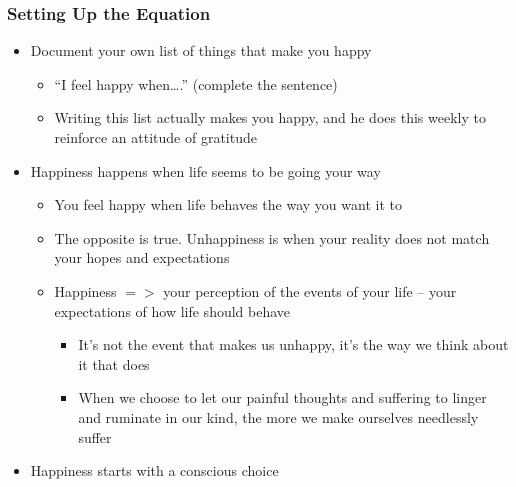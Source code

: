 \begin{frame}[fragile]\frametitle{Setting Up the Equation}

\begin{itemize}
\item Document your own list of things that make you happy
	\begin{itemize}
	\item “I feel happy when….” (complete the sentence)
	\item Writing this list actually makes you happy, and he does this weekly to reinforce an attitude of gratitude 
	\end{itemize}
\item Happiness happens when life seems to be going your way
	\begin{itemize}
	\item You feel happy when life behaves the way you want it to
	\item The opposite is true. Unhappiness is when your reality does not match your hopes and expectations
	\item Happiness $=>$ your perception of the events of your life – your expectations of how life should behave
		\begin{itemize}
		\item It’s not the event that makes us unhappy, it’s the way we think about it that does
		\item When we choose to let our painful thoughts and suffering to linger and ruminate in our kind, the more we make ourselves needlessly suffer
		\end{itemize}
	\end{itemize}
\item Happiness starts with a conscious choice
\end{itemize}
\end{frame}

